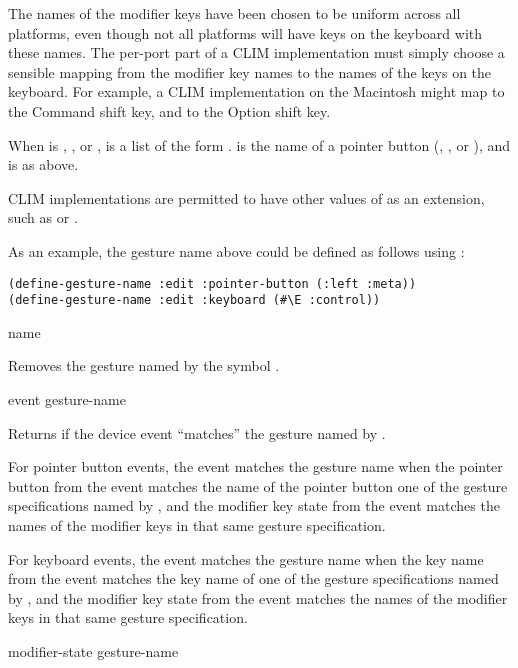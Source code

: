 The names of the modifier keys have been chosen to be uniform across all
platforms, even though not all platforms will have keys on the keyboard with
these names.  The per-port part of a CLIM implementation must simply choose a
sensible mapping from the modifier key names to the names of the keys on the
keyboard.  For example, a CLIM implementation on the Macintosh might map
 to the Command shift key, and  to the Option shift key.

When  is , , or
,  is a list of the form
.   is the name of a pointer
button (, , or ), and 
is as above.

CLIM implementations are permitted to have other values of  as an
extension, such as  or .

As an example, the  gesture name above could be defined as follows
using :

\begin{verbatim}
(define-gesture-name :edit :pointer-button (:left :meta))
(define-gesture-name :edit :keyboard (#\E :control))
\end{verbatim}

 {name}

Removes the gesture named by the symbol .


 {event gesture-name}

Returns  if the device event  ``matches'' the gesture
named by .

For pointer button events, the event matches the gesture name when the pointer
button from the event matches the name of the pointer button one of the gesture
specifications named by , and the modifier key state from the
event matches the names of the modifier keys in that same gesture specification.

For keyboard events, the event matches the gesture name when the key name from
the event matches the key name of one of the gesture specifications named by
, and the modifier key state from the event matches the names
of the modifier keys in that same gesture specification.

 {modifier-state gesture-name}

